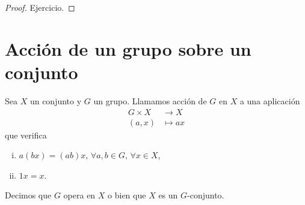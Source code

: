 \begin{proof}
    Ejercicio.
\end{proof}

\section{Acción de un grupo sobre un conjunto}

\begin{defi}
    Sea $X$ un conjunto y $G$ un grupo. Llamamos acción de $G$ en $X$ a una aplicación
    \[
        \begin{aligned}
            G \times X &\to X \\
            (a, x) &\mapsto ax
        \end{aligned}
    \]
    que verifica
    \begin{enumerate}[i)]
        \item $a(bx) = (ab)x$, $\forall a,b \in G$, $\forall x \in X$,
        \item $1x = x$.
    \end{enumerate}
    Decimos que $G$ opera en $X$ o bien que $X$ es un $G$-conjunto.
\end{defi}

